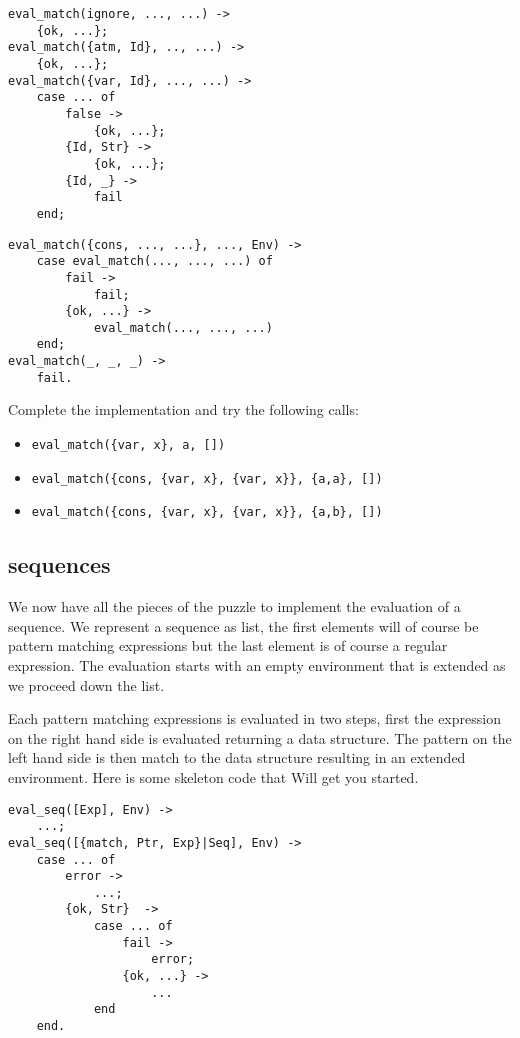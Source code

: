 \documentclass[a4paper,11pt]{article}
\begin{document}
\begin{verbatim}
eval_match(ignore, ..., ...) ->
    {ok, ...};
eval_match({atm, Id}, .., ...) ->    
    {ok, ...};
eval_match({var, Id}, ..., ...) -> 
    case ... of
        false ->
            {ok, ...};
        {Id, Str} ->
            {ok, ...};
        {Id, _} ->
            fail
    end;
\end{verbatim}
\begin{verbatim}
eval_match({cons, ..., ...}, ..., Env) -> 
    case eval_match(..., ..., ...) of
        fail ->
            fail;
        {ok, ...} ->
            eval_match(..., ..., ...)
    end;
eval_match(_, _, _) -> 
    fail.
\end{verbatim}

Complete the implementation and try the following calls:

\begin{itemize}
 \item {\tt eval\_match(\{var, x\}, a, [])}
 \item {\tt eval\_match(\{cons, \{var, x\}, \{var, x\}\}, \{a,a\}, [])}
 \item {\tt eval\_match(\{cons, \{var, x\}, \{var, x\}\}, \{a,b\}, [])}
\end{itemize}

\subsection{sequences}

We now have all the pieces of the puzzle to implement the evaluation
of a sequence. We represent a sequence as list, the first elements
will of course be pattern matching expressions but the last element is
of course a regular expression. The evaluation starts with an empty
environment that is extended as we proceed down the list.

Each pattern matching expressions is evaluated in two steps, first the
expression on the right hand side is evaluated returning a data
structure. The pattern on the left hand side is then match to the data
structure resulting in an extended environment. Here is some skeleton
code that Will get you started.

\begin{verbatim}
eval_seq([Exp], Env) ->
    ...;
eval_seq([{match, Ptr, Exp}|Seq], Env) ->
    case ... of
        error -> 
            ...;
        {ok, Str}  ->
            case ... of
                fail ->
                    error;
                {ok, ...} ->
                    ...
            end
    end.
\end{verbatim}
\end{document}
